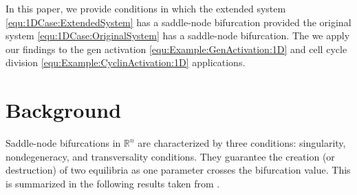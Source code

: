 \documentclass[12pt]{article}
\begin{document}

In this paper, we provide conditions in which the extended system \eqref{equ:1DCase:ExtendedSystem} has a saddle-node bifurcation provided the original system \eqref{equ:1DCase:OriginalSystem} has a saddle-node bifurcation. The we apply our findings to the gen activation \eqref{equ:Example:GenActivation:1D} and cell cycle division \eqref{equ:Example:CyclinActivation:1D} applications.

\section{Background}

Saddle-node bifurcations in $\mathbb{R}^{n}$ are characterized by three conditions: singularity, nondegeneracy, and transversality conditions. They guarantee the creation (or destruction) of two equilibria as one parameter crosses the bifurcation value. This is summarized in the following results taken from \citet[Ch. 8]{Meiss2007}.
\end{document}
